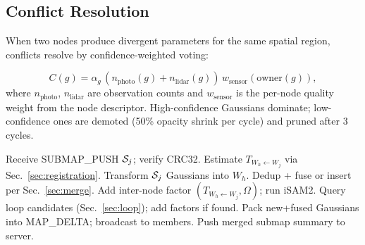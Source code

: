 \subsection{Conflict Resolution}

\label{sec:conflict}

When two nodes produce divergent parameters for the same spatial region,
conflicts resolve by confidence-weighted voting:

\begin{equation}
  C(g)=\alpha_g\,(n_{\text{photo}}(g)+n_{\text{lidar}}(g))\,w_{\text{sensor}}(\text{owner}(g)),
\end{equation}
where $n_{\text{photo}}$, $n_{\text{lidar}}$ are observation counts and
$w_{\text{sensor}}$ is the per-node quality weight from the node descriptor.
High-confidence Gaussians dominate; low-confidence ones are demoted (50\%
opacity shrink per cycle) and pruned after 3 cycles.

\begin{algorithm}[t]
\caption{Cooperative mapping loop (head-side, per received submap).}
\label{alg:coop}
\begin{algorithmic}[1]
\State Receive SUBMAP\_PUSH $\mathcal{S}_j$; verify CRC32.
\State Estimate $T_{W_h\leftarrow W_j}$ via Sec.~\ref{sec:registration}.
\State Transform $\mathcal{S}_j$ Gaussians into $W_h$.
  \State Dedup + fuse or insert per Sec.~\ref{sec:merge}.
\EndFor
\State Add inter-node factor $(T_{W_h\leftarrow W_j},\Omega)$; run iSAM2.
\State Query loop candidates (Sec.~\ref{sec:loop}); add factors if found.
\State Pack new+fused Gaussians into MAP\_DELTA; broadcast to members.
 \State Push merged submap summary to server. \EndIf
\end{algorithmic}
\end{algorithm}
